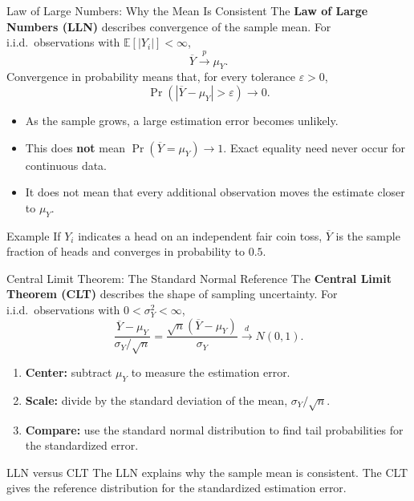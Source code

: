 \documentclass[10pt,aspectratio=169]{beamer}
\newcommand{\E}{\mathbb{E}}
\newcommand{\Prb}{\operatorname{Pr}}
\begin{document}
\begin{frame}{Law of Large Numbers: Why the Mean Is Consistent}
The \textbf{Law of Large Numbers (LLN)} describes convergence of the sample mean.
For i.i.d.\ observations with $\E[|Y_i|]<\infty$,
\[
\overline Y\xrightarrow{p}\mu_Y.
\]
Convergence in probability means that, for every tolerance $\varepsilon>0$,
\[
\Prb(|\overline Y-\mu_Y|>\varepsilon)\longrightarrow0.
\]
\begin{itemize}
\item As the sample grows, a large estimation error becomes unlikely.
\item This does \textbf{not} mean $\Prb(\overline Y=\mu_Y)\to1$. Exact equality need never occur for continuous data.
\item It does not mean that every additional observation moves the estimate closer to $\mu_Y$.
\end{itemize}
\begin{block}{Example}
If $Y_i$ indicates a head on an independent fair coin toss, $\overline Y$ is the sample fraction of heads and converges in probability to $0.5$.
\end{block}
\end{frame}

\begin{frame}{Central Limit Theorem: The Standard Normal Reference}
The \textbf{Central Limit Theorem (CLT)} describes the shape of sampling uncertainty.
For i.i.d.\ observations with $0<\sigma_Y^2<\infty$,
\[
\frac{\overline Y-\mu_Y}{\sigma_Y/\sqrt n}
=\frac{\sqrt n(\overline Y-\mu_Y)}{\sigma_Y}
\xrightarrow{d}N(0,1).
\]
\begin{enumerate}
\item \textbf{Center:} subtract $\mu_Y$ to measure the estimation error.
\item \textbf{Scale:} divide by the standard deviation of the mean, $\sigma_Y/\sqrt n$.
\item \textbf{Compare:} use the standard normal distribution to find tail probabilities for the standardized error.
\end{enumerate}
\begin{block}{LLN versus CLT}
The LLN explains why the sample mean is consistent. The CLT gives the reference distribution for the standardized estimation error.
\end{block}
\end{frame}
\end{document}
